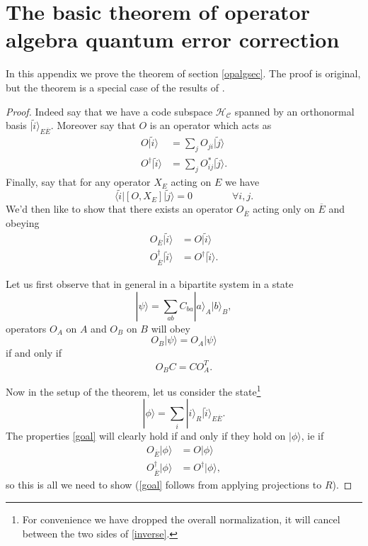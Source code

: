 \documentclass[11pt]{article}
\newcommand{\be}{\begin{equation}}
\newcommand{\ee}{\end{equation}}
\newcommand{\HC}{\mathcal{H}_{\mathcal{C}}}
\newcommand{\lan}{\langle}
\newcommand{\ran}{\rangle}
\newcommand{\wt}{\widetilde}
\newcommand{\ol}{\overline}
\begin{document}
\section{The basic theorem of operator algebra quantum error correction} \label{thmapp}
In this appendix we prove the theorem of section \ref{opalgsec}.  The proof is original, but the theorem is a special case of the results of \cite{beny2007generalization,beny2007quantum}.
\begin{proof}
Indeed say that we have a code subspace $\HC$ spanned by an orthonormal basis $|\wt{i}\ran_{E\ol{E}}$.  Moreover say that $O$ is an operator which acts as
\begin{align}\nonumber
O|\wt{i}\ran&=\sum_j O_{ji}|\wt{j}\ran\\
O^\dagger|\wt{i}\ran&=\sum_j O_{ij}^*|\wt{j}\ran.
\end{align}
Finally, say that for any operator $X_E$ acting on $E$ we have
\be\label{commcond}
\lan \wt{i}|[O,X_E]|\wt{j}\ran=0  \qquad \qquad \forall  i,j.
\ee
We'd then like to show that there exists an operator $O_{\ol{E}}$ acting only on $\ol{E}$ and obeying
\begin{align}\nonumber
O_{\ol{E}}|\wt{i}\ran&=O|\wt{i}\ran\\
O_{\ol{E}}^\dagger|\wt{i}\ran&=O^\dagger |\wt{i}\ran.\label{goal}
\end{align}

Let us first observe that in general in a bipartite system in a state
\be
|\psi\ran=\sum_{ab}C_{ba}|a\ran_A |b\ran_B,
\ee
operators $O_A$ on $A$ and $O_B$ on $B$ will obey 
\be
O_B|\psi\ran=O_A|\psi\ran
\ee
if and only if 
\be\label{inverse}
O_B C=C O_A^T.
\ee


Now in the setup of the theorem, let us consider the state\footnote{For convenience we have dropped the overall normalization, it will cancel between the two sides of \eqref{inverse}.}
\be\label{phidef}
|\phi\ran=\sum_i|i\ran_R |\wt{i}\ran_{E\ol{E}}.
\ee
The properties \eqref{goal} will clearly hold if and only if they hold on $|\phi\ran$, ie if
\begin{align}\nonumber
O_{\ol{E}}|\phi\ran&=O|\phi\ran\\
O_{\ol{E}}^\dagger|\phi\ran&=O^\dagger |\phi\ran,\label{goal2}
\end{align}
so this is all we need to show (\eqref{goal} follows from applying projections to $R$).  


\end{proof}
\end{document}
